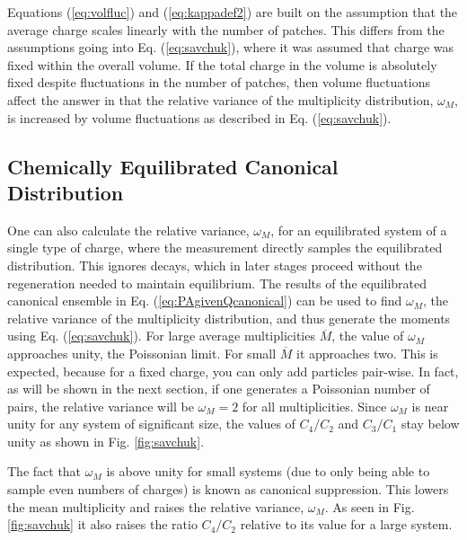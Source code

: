 Equations (\ref{eq:volfluc}) and (\ref{eq:kappadef2}) are built on the assumption that the average charge scales linearly with the number of patches. This differs from the assumptions going into Eq. (\ref{eq:savchuk}), where it was assumed that charge was fixed within the overall volume. If the total charge in the volume is absolutely fixed despite fluctuations in the number of patches, then volume fluctuations affect the answer in that the relative variance of the multiplicity distribution, $\omega_M$, is increased by volume fluctuations as described in Eq. (\ref{eq:savchuk}).

\subsection{Chemically Equilibrated Canonical Distribution}\label{sec:singlecharge}

One can also calculate the relative variance, $\omega_M$, for an equilibrated system of a single type of charge, where the measurement directly samples the equilibrated distribution. This ignores decays, which in later stages proceed without the regeneration needed to maintain equilibrium. The results of the equilibrated canonical ensemble in Eq. (\ref{eq:PAgivenQcanonical}) can be used to find $\omega_M$, the relative variance of the multiplicity distribution, and thus generate the moments using Eq. (\ref{eq:savchuk}). For large average multiplicities $\overline{M}$, the value of $\omega_M$ approaches unity, the Poissonian limit. For small $\overline{M}$ it approaches two. This is expected, because for a fixed charge, you can only add particles pair-wise. In fact, as will be shown in the next section, if one generates a Poissonian number of pairs, the relative variance will be $\omega_M=2$ for all multiplicities. Since $\omega_M$ is near unity for any system of significant size, the values of $C_4/C_2$ and $C_3/C_1$ stay below unity as shown in Fig. \ref{fig:savchuk}.

The fact that $\omega_M$ is above unity for small systems (due to only being able to sample even numbers of charges) is known as canonical suppression. This lowers the mean multiplicity and raises the relative variance, $\omega_M$. As seen in Fig. \ref{fig:savchuk} it also raises the ratio $C_4/C_2$ relative to its value for a large system. 

